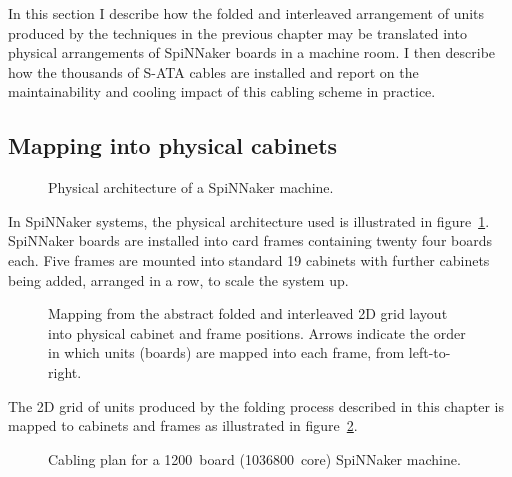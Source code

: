 		In this section I describe how the folded and interleaved arrangement of
		units produced by the techniques in the previous chapter may be translated
		into physical arrangements of SpiNNaker boards in a machine room. I then
		describe how the thousands of S-ATA cables are installed and report on the
		maintainability and cooling impact of this cabling scheme in practice.
		
		\subsection{Mapping into physical cabinets}
			
			\begin{figure}
				\center
				
				\caption{Physical architecture of a SpiNNaker machine.}
				\label{fig:cabinet-units}
			\end{figure}
			
			In SpiNNaker systems, the physical architecture used is illustrated in
			figure~\ref{fig:cabinet-units}. SpiNNaker boards are installed into card
			frames containing twenty four boards each. Five frames are mounted into
			standard 19\inch{} cabinets with further cabinets being added, arranged in
			a row, to scale the system up.
			
			\begin{figure}
				\center
				
				\caption[Mapping cabling from abstract to physical space.]%
				{Mapping from the abstract folded and interleaved 2D grid
				layout into physical cabinet and frame positions. Arrows indicate the
				order in which units (boards) are mapped into each frame, from
				left-to-right.}
				\label{fig:cabinetisation}
			\end{figure}
			
			The 2D grid of units produced by the folding process described in this
			chapter is mapped to cabinets and frames as illustrated in
			figure~\ref{fig:cabinetisation}.
			
			\begin{figure}
				\center
				
				\caption[Cabling plan for a \num{1200}~board SpiNNaker machine.]%
				{Cabling plan for a \num{1200}~board (\num{1036800}~core)
				SpiNNaker machine.}
				\label{fig:million-core-machine}
			\end{figure}
			
